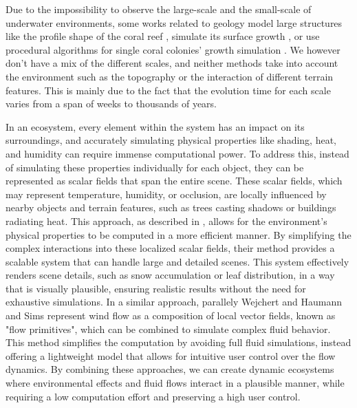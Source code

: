 Due to the impossibility to observe the large-scale and the small-scale of underwater environments, some works related to geology model large structures like the profile shape of the coral reef \cite{Bosscher1992}, simulate its surface growth \cite{Li2021}, or use procedural algorithms for single coral colonies' growth simulation \cite{Abela2015}. We however don't have a mix of the different scales, and neither methods take into account the environment such as the topography or the interaction of different terrain features. This is mainly due to the fact that the evolution time for each scale varies from a span of weeks to thousands of years.

In an ecosystem, every element within the system has an impact on its surroundings, and accurately simulating physical properties like shading, heat, and humidity can require immense computational power. To address this, instead of simulating these properties individually for each object, they can be represented as scalar fields that span the entire scene. These scalar fields, which may represent temperature, humidity, or occlusion, are locally influenced by nearby objects and terrain features, such as trees casting shadows or buildings radiating heat. This approach, as described in \cite{Grosbellet2016, Guerin2016a}, allows for the environment's physical properties to be computed in a more efficient manner. By simplifying the complex interactions into these localized scalar fields, their method provides a scalable system that can handle large and detailed scenes. This system effectively renders scene details, such as snow accumulation or leaf distribution, in a way that is visually plausible, ensuring realistic results without the need for exhaustive simulations. 
In a similar approach, parallely Wejchert and Haumann \cite{Wejchert1991} and Sims \cite{Sims1990} represent wind flow as a composition of local vector fields, known as "flow primitives", which can be combined to simulate complex fluid behavior. This method simplifies the computation by avoiding full fluid simulations, instead offering a lightweight model that allows for intuitive user control over the flow dynamics.
By combining these approaches, we can create dynamic ecosystems where environmental effects and fluid flows interact in a plausible manner, while requiring a low computation effort and preserving a high user control.


